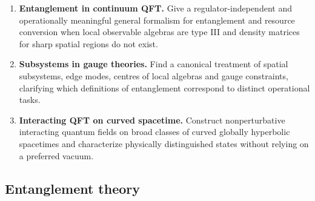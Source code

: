 \documentclass{article}
\begin{document}
\begin{enumerate}[label=\textbf{QF\arabic*.},leftmargin=*]
\item \formalism{} \textbf{Entanglement in continuum QFT.}
Give a regulator-independent and operationally meaningful general
formalism for entanglement and resource conversion when local
observable algebras are type III and density matrices for sharp spatial
regions do not exist.

\item \formalism{} \textbf{Subsystems in gauge theories.}
Find a canonical treatment of spatial subsystems, edge modes, centres
of local algebras and gauge constraints, clarifying which definitions
of entanglement correspond to distinct operational tasks.

\item \precise{} \textbf{Interacting QFT on curved spacetime.}
Construct nonperturbative interacting quantum fields on broad classes
of curved globally hyperbolic spacetimes and characterize physically
distinguished states without relying on a preferred vacuum.

\end{enumerate}


\subsection{Entanglement theory}
\end{document}
